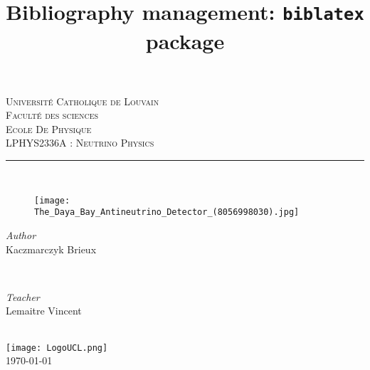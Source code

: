 \documentclass [12pt] {article}
\title{Bibliography management: \texttt{biblatex} package}
\numberwithin{equation}{section} %
\numberwithin{figure}{section}   %
\begin{document}
\begin{titlepage}
	\center
	\center 
		\textsc{\LARGE Université Catholique de Louvain}\\ [0,5cm]
		\textsc{\Large Faculté des sciences}\\[0.3cm]
		\textsc{\Large Ecole De Physique} \\[0.3cm]
		
    
    \textsc{\LARGE LPHYS2336A : Neutrino Physics}\\[0.2 cm]
    
    
	\rule{\linewidth}{0.2 mm} \\[0.4 cm]

     \begin{figure}[H]
        \centering
        \texttt{[image: The\_Daya\_Bay\_Antineutrino\_Detector\_(8056998030).jpg]}
    \end{figure}
	
	\vspace{0.5 cm}
	
	
\begin{minipage}{0.4\textwidth}
	\begin{flushleft} \large
	\emph{Author}\\
    	Kaczmarczyk Brieux\\
		
		
	\end{flushleft}
\end{minipage}~
\begin{minipage}{0.4\textwidth}
	\begin{flushright} \large
		\emph{Teacher}\\ 
		   Lemaitre Vincent\\
		  
	\end{flushright}
\end{minipage}\\[2 cm]
  \texttt{[image: LogoUCL.png]}\\[0.2cm]	%
  	
           
            
	\vfill\vfill\vfill 	
	{\large\today}

\end{titlepage}
\end{document}
